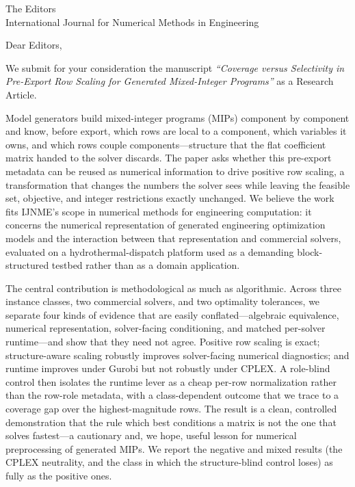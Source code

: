 \documentclass[11pt]{letter}
\begin{document}
\begin{letter}{The Editors\\International Journal for Numerical Methods in Engineering}

\opening{Dear Editors,}

We submit for your consideration the manuscript \emph{``Coverage versus Selectivity in
Pre-Export Row Scaling for Generated Mixed-Integer Programs''} as a Research Article.

Model generators build mixed-integer programs (MIPs) component by component and know,
before export, which rows are local to a component, which variables it owns, and which
rows couple components---structure that the flat coefficient matrix handed to the solver
discards. The paper asks whether this pre-export metadata can be reused as numerical
information to drive positive row scaling, a transformation that changes the numbers the
solver sees while leaving the feasible set, objective, and integer restrictions exactly
unchanged. We believe the work fits I{}JNME's scope in numerical methods for engineering
computation: it concerns the numerical representation of generated engineering
optimization models and the interaction between that representation and commercial
solvers, evaluated on a hydrothermal-dispatch platform used as a demanding
block-structured testbed rather than as a domain application.

The central contribution is methodological as much as algorithmic. Across three instance
classes, two commercial solvers, and two optimality tolerances, we separate four kinds of
evidence that are easily conflated---algebraic equivalence, numerical representation,
solver-facing conditioning, and matched per-solver runtime---and show that they need not
agree. Positive row scaling is exact; structure-aware scaling robustly improves
solver-facing numerical diagnostics; and runtime improves under Gurobi but not robustly
under CPLEX. A role-blind control then isolates the runtime lever as a cheap per-row
normalization rather than the row-role metadata, with a class-dependent outcome that we
trace to a coverage gap over the highest-magnitude rows. The result is a clean, controlled
demonstration that the rule which best conditions a matrix is not the one that solves
fastest---a cautionary and, we hope, useful lesson for numerical preprocessing of
generated MIPs. We report the negative and mixed results (the CPLEX neutrality, and the
class in which the structure-blind control loses) as fully as the positive ones.


\end{letter}
\end{document}
